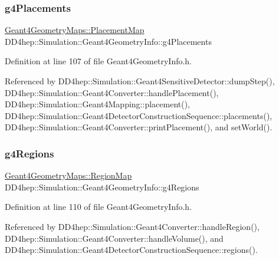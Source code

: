 \subsubsection{\texorpdfstring{g4\+Placements}{g4Placements}}
{\footnotesize\ttfamily \hyperlink{namespace_d_d4hep_1_1_simulation_1_1_geant4_geometry_maps_a587c0a02d3847f03e6427093c90e93d2}{Geant4\+Geometry\+Maps\+::\+Placement\+Map} D\+D4hep\+::\+Simulation\+::\+Geant4\+Geometry\+Info\+::g4\+Placements}



Definition at line 107 of file Geant4\+Geometry\+Info.\+h.



Referenced by D\+D4hep\+::\+Simulation\+::\+Geant4\+Sensitive\+Detector\+::dump\+Step(), D\+D4hep\+::\+Simulation\+::\+Geant4\+Converter\+::handle\+Placement(), D\+D4hep\+::\+Simulation\+::\+Geant4\+Mapping\+::placement(), D\+D4hep\+::\+Simulation\+::\+Geant4\+Detector\+Construction\+Sequence\+::placements(), D\+D4hep\+::\+Simulation\+::\+Geant4\+Converter\+::print\+Placement(), and set\+World().

\hypertarget{class_d_d4hep_1_1_simulation_1_1_geant4_geometry_info_aee8fb6dc1279abe93e73ccf67c41d011}{}\label{class_d_d4hep_1_1_simulation_1_1_geant4_geometry_info_aee8fb6dc1279abe93e73ccf67c41d011} 
\subsubsection{\texorpdfstring{g4\+Regions}{g4Regions}}
{\footnotesize\ttfamily \hyperlink{namespace_d_d4hep_1_1_simulation_1_1_geant4_geometry_maps_afb7f77d7599fee831bfb2341123e8377}{Geant4\+Geometry\+Maps\+::\+Region\+Map} D\+D4hep\+::\+Simulation\+::\+Geant4\+Geometry\+Info\+::g4\+Regions}



Definition at line 110 of file Geant4\+Geometry\+Info.\+h.



Referenced by D\+D4hep\+::\+Simulation\+::\+Geant4\+Converter\+::handle\+Region(), D\+D4hep\+::\+Simulation\+::\+Geant4\+Converter\+::handle\+Volume(), and D\+D4hep\+::\+Simulation\+::\+Geant4\+Detector\+Construction\+Sequence\+::regions().

\hypertarget{class_d_d4hep_1_1_simulation_1_1_geant4_geometry_info_ad35660bb944a3d8133ef17abeb898d0f}{}\label{class_d_d4hep_1_1_simulation_1_1_geant4_geometry_info_ad35660bb944a3d8133ef17abeb898d0f} 
